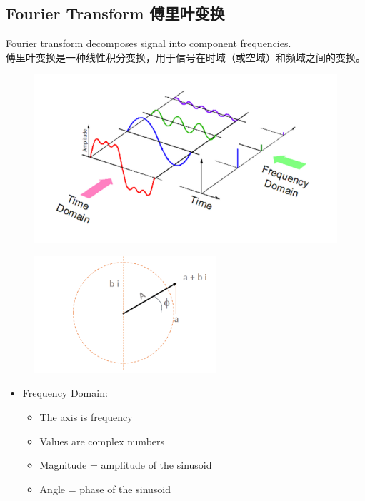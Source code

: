 \documentclass[11pt]{article}
\begin{document}
\subsection{Fourier Transform 傅里叶变换}
Fourier transform decomposes signal into component frequencies.\\
傅里叶变换是一种线性积分变换，用于信号在时域（或空域）和频域之间的变换。

\begin{figure}[bht!]
  \centering
  \includegraphics[width=\textwidth]{images/fourier.png}
\end{figure}

\begin{figure}[bht!]
  \centering
  \includegraphics[width=0.6\textwidth]{images/angle.png}
\end{figure}

\begin{itemize}
  \item Frequency Domain:
        \begin{itemize}
          \item The axis is frequency
          \item Values are complex numbers
          \item Magnitude = amplitude of the sinusoid
          \item Angle = phase of the sinusoid
        \end{itemize}
\end{itemize}
\end{document}

